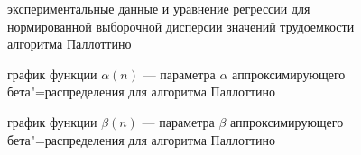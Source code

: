 \documentclass[a4paper,fontsize=14pt]{article}
\begin{document}
\begin{figure}[!]
	\caption{экспериментальные данные и уравнение регрессии для нормированной выборочной дисперсии значений трудоемкости алгоритма Паллоттино}
	\label{image2}
\end{figure}

\begin{figure}[!]
	\caption{график функции $\alpha(n)$ — параметра $\alpha$ аппроксимирующего бета"=распределения для алгоритма Паллоттино}
	\label{image3}
\end{figure}

\begin{figure}[!]
	\caption{график функции $\beta(n)$ — параметра $\beta$ аппроксимирующего бета"=распределения для алгоритма Паллоттино}
	\label{image4}
\end{figure}
\end{document}
